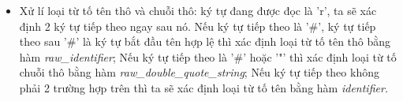 \begin{itemize}




  \item Xử lí loại từ tố tên thô và chuỗi thô: ký tự đang được đọc là 'r', ta sẽ xác định 2 ký tự tiếp theo ngay sau nó. Nếu ký tự tiếp theo là '\#', ký tự tiếp theo sau '\#' là ký tự bắt đầu tên hợp lệ thì xác định loại từ tố tên thô bằng hàm \textit{raw\_identifier}; Nếu ký tự tiếp theo là '\#' hoặc '"' thì xác định loại từ tố chuỗi thô bằng hàm \textit{raw\_double\_quote\_string}; Nếu ký tự tiếp theo không phải 2 trường hợp trên thì ta sẽ xác định loại từ tố tên bằng hàm \textit{identifier.}


\end{itemize}

